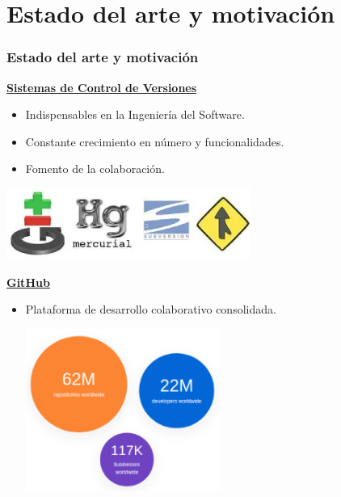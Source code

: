 \documentclass{beamer}
\begin{document}
\section{Estado del arte y motivación}
\begin{frame}[allowframebreaks]
	\frametitle{Estado del arte y motivación}
	
	\underline{{\bfseries Sistemas de Control de Versiones}}
	\bigskip
	
	\begin{itemize}
       \item Indispensables en la Ingeniería del Software.
	   \item Constante crecimiento en número y funcionalidades. 
	   \item Fomento de la colaboración.	
	\end{itemize}
	\bigskip
	
	\begin{center}
		\includegraphics[width=0.6\textwidth]{images/control-versiones2.eps}
	\end{center}
	
	\framebreak

	\vspace*{0.18cm}	
	\underline{{\bfseries GitHub}}

	\begin{itemize}
       \item Plataforma de desarrollo colaborativo consolidada.
       \begin{center}
	       \includegraphics[width=0.5\textwidth]{images/github-stats.eps}
	   \end{center}
       \framebreak
       

\end{itemize}
\end{frame}
\end{document}
